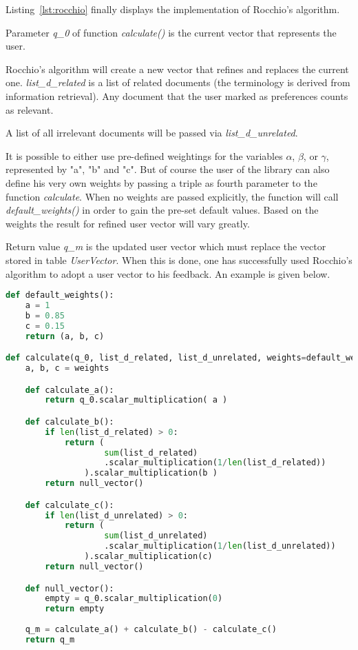 Listing~\ref{lst:rocchio} finally displays the implementation of Rocchio's algorithm.

Parameter \textit{q\_0} of function \textit{calculate()} is the current vector that represents the user.

Rocchio's algorithm will create a new vector that refines and replaces the current one.
\textit{list\_d\_related} is a list of related documents (the terminology is derived from information retrieval).
Any document that the user marked as preferences counts as relevant.

A list of all irrelevant documents will be passed via \textit{list\_d\_unrelated}.

It is possible to either use pre-defined weightings for the variables $\alpha$, $\beta$, or $\gamma$, represented by "a", "b" and "c".
But of course the user of the library can also define his very own weights by passing a triple as fourth parameter to the function \textit{calculate}.
When no weights are passed explicitly, the function will call \textit{default\_weights()} in order to gain the pre-set default values.
Based on the weights the result for refined user vector will vary greatly.

Return value \textit{q\_m} is the updated user vector which must replace the vector stored in table \textit{UserVector}.
When this is done, one has successfully used Rocchio's algorithm to adopt a user vector to his feedback.
An example is given below.

\begin{lstlisting}[language=Python,caption={Implementation of Rocchio's algorithm},label={lst:rocchio}]
def default_weights():
    a = 1
    b = 0.85
    c = 0.15
    return (a, b, c)

def calculate(q_0, list_d_related, list_d_unrelated, weights=default_weights()):
    a, b, c = weights

    def calculate_a():
        return q_0.scalar_multiplication( a )

    def calculate_b():
        if len(list_d_related) > 0:
            return (
                    sum(list_d_related)
                    .scalar_multiplication(1/len(list_d_related))
                ).scalar_multiplication(b )
        return null_vector()

    def calculate_c():
        if len(list_d_unrelated) > 0:
            return (
                    sum(list_d_unrelated)
                    .scalar_multiplication(1/len(list_d_unrelated))
                ).scalar_multiplication(c)
        return null_vector()

    def null_vector():
        empty = q_0.scalar_multiplication(0)
        return empty
        
    q_m = calculate_a() + calculate_b() - calculate_c()
    return q_m
\end{lstlisting}

